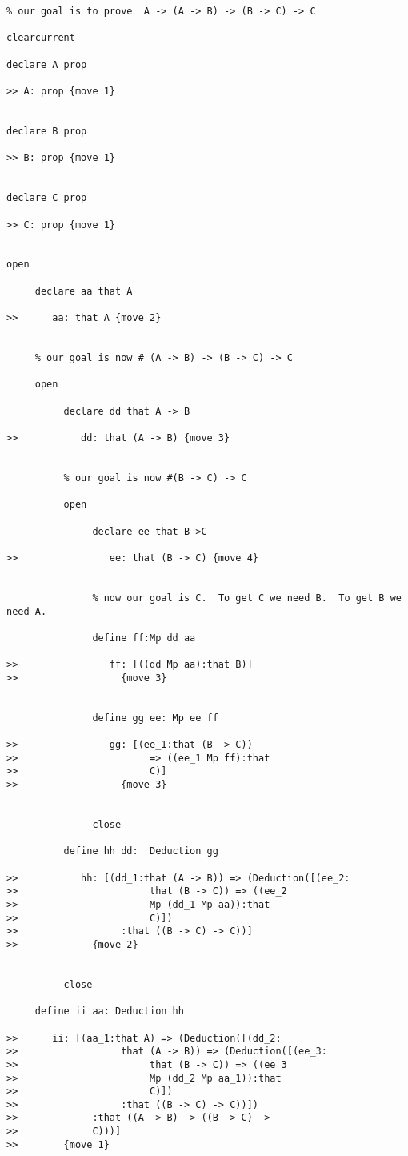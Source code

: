 \documentclass[12pt]{article}
\begin{document}
\begin{verbatim}
% our goal is to prove  A -> (A -> B) -> (B -> C) -> C

clearcurrent

declare A prop

>> A: prop {move 1}


declare B prop

>> B: prop {move 1}


declare C prop

>> C: prop {move 1}


open

     declare aa that A

>>      aa: that A {move 2}


     % our goal is now # (A -> B) -> (B -> C) -> C

     open

          declare dd that A -> B

>>           dd: that (A -> B) {move 3}


          % our goal is now #(B -> C) -> C

          open

               declare ee that B->C

>>                ee: that (B -> C) {move 4}


               % now our goal is C.  To get C we need B.  To get B we need A.

               define ff:Mp dd aa

>>                ff: [((dd Mp aa):that B)]
>>                  {move 3}


               define gg ee: Mp ee ff

>>                gg: [(ee_1:that (B -> C)) 
>>                       => ((ee_1 Mp ff):that 
>>                       C)]
>>                  {move 3}


               close

          define hh dd:  Deduction gg

>>           hh: [(dd_1:that (A -> B)) => (Deduction([(ee_2:
>>                       that (B -> C)) => ((ee_2 
>>                       Mp (dd_1 Mp aa)):that 
>>                       C)])
>>                  :that ((B -> C) -> C))]
>>             {move 2}


          close

     define ii aa: Deduction hh

>>      ii: [(aa_1:that A) => (Deduction([(dd_2:
>>                  that (A -> B)) => (Deduction([(ee_3:
>>                       that (B -> C)) => ((ee_3 
>>                       Mp (dd_2 Mp aa_1)):that 
>>                       C)])
>>                  :that ((B -> C) -> C))])
>>             :that ((A -> B) -> ((B -> C) -> 
>>             C)))]
>>        {move 1}



\end{verbatim}
\end{document}
